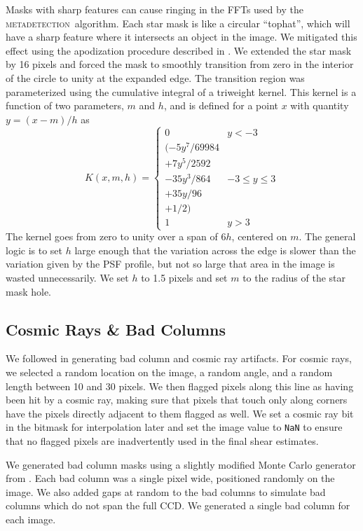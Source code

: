 \documentclass[twocolumn,twocolappendix,astrosym]{openjournal}
\newcommand{\mdet}{\textsc{metadetection}}
\begin{document}
Masks with sharp features can cause ringing in the FFTs used by the \mdet\
algorithm.   Each star mask is like a circular ``tophat'', which will have a
sharp feature where it intersects an object in the image.  We mitigated this
effect using the apodization procedure described in \citet{BeckerMdetCoadd}. We
extended the star mask by 16 pixels and forced the mask to smoothly transition
from zero in the interior of the circle to unity at the expanded edge. The
transition region was parameterized using the cumulative integral of a
triweight kernel. This kernel is a function of two parameters, $m$ and $h$, and
is defined for a point $x$ with quantity $y = (x-m)/h$ as
\begin{equation}
K(x, m, h) = \begin{cases}
0 & y < -3 \\
(-5y^7 / 69984 \\
+ 7y^5 / 2592 \\
- 35y^3 / 864 & -3 \le y \le 3 \\
+ 35y / 96 \\
+ 1 / 2) \\
1 & y > 3
\end{cases}
\end{equation}
The kernel goes from zero to unity over a span of $6h$, centered on $m$.  The
general logic is to set $h$ large enough that the variation across the edge is
slower than the variation given by the PSF profile, but not so large that area
in the image is wasted unnecessarily. We set $h$ to 1.5 pixels and set $m$ to
the radius of the star mask hole.

\subsection{Cosmic Rays \& Bad Columns} \label{sec:sim:cosmics_badcols}

We followed \citet{BeckerMdetCoadd} in generating bad column and cosmic ray artifacts.
For cosmic rays, we selected a random location on the image, a random angle, and a random
length between 10 and 30 pixels. We then flagged pixels along this line as having been hit
by a cosmic ray, making sure that pixels that touch only along corners have the pixels
directly adjacent to them flagged as well. We set a cosmic ray bit in the bitmask for
interpolation later and set the image value to \texttt{NaN} to ensure that no flagged
pixels are inadvertently used in the final shear estimates.

We generated bad column masks using a slightly modified Monte Carlo generator
from \citet{BeckerMdetCoadd}. Each bad column was a single pixel wide,
positioned randomly on the image. We also added gaps at random to the bad
columns to simulate bad columns which do not span the full CCD.  We generated
a single bad column for each image.
\end{document}
